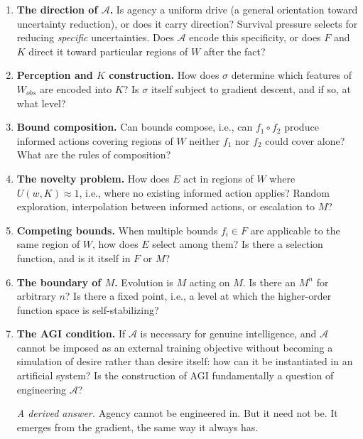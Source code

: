 \documentclass[
]{article}
\begin{document}
\begin{enumerate}
  Formal derivation of this claim from thermodynamic first principles
  (connecting \(U_{lethal}^d\) to physical entropy thresholds and
  demonstrating the inevitability of primitive \(\mathcal{A}\) from
  dissipative system dynamics) remains open. See Prigogine (dissipative
  structures) and England (dissipative adaptation) for adjacent physical
  frameworks.
\item
  \textbf{The direction of \(\mathcal{A}\).} Is agency a uniform drive
  (a general orientation toward uncertainty reduction), or does it carry
  direction? Survival pressure selects for reducing \emph{specific}
  uncertainties. Does \(\mathcal{A}\) encode this specificity, or does
  \(F\) and \(K\) direct it toward particular regions of \(W\) after the
  fact?
\item
  \textbf{Perception and \(K\) construction.} How does \(\sigma\)
  determine which features of \(W_{obs}\) are encoded into \(K\)? Is
  \(\sigma\) itself subject to gradient descent, and if so, at what
  level?
\item
  \textbf{Bound composition.} Can bounds compose, i.e., can
  \(f_1 \circ f_2\) produce informed actions covering regions of \(W\)
  neither \(f_1\) nor \(f_2\) could cover alone? What are the rules of
  composition?
\item
  \textbf{The novelty problem.} How does \(E\) act in regions of \(W\)
  where \(U(w, K) \approx 1\), i.e., where no existing informed action
  applies? Random exploration, interpolation between informed actions,
  or escalation to \(M\)?
\item
  \textbf{Competing bounds.} When multiple bounds \(f_i \in F\) are
  applicable to the same region of \(W\), how does \(E\) select among
  them? Is there a selection function, and is it itself in \(F\) or
  \(M\)?
\item
  \textbf{The boundary of \(M\).} Evolution is \(M\) acting on \(M\). Is
  there an \(M^n\) for arbitrary \(n\)? Is there a fixed point, i.e., a
  level at which the higher-order function space is self-stabilizing?
\item
  \textbf{The AGI condition.} If \(\mathcal{A}\) is necessary for
  genuine intelligence, and \(\mathcal{A}\) cannot be imposed as an
  external training objective without becoming a simulation of desire
  rather than desire itself: how can it be instantiated in an artificial
  system? Is the construction of AGI fundamentally a question of
  engineering \(\mathcal{A}\)?

  \emph{A derived answer.} Agency cannot be engineered in. But it need
  not be. It emerges from the gradient, the same way it always has.


\end{enumerate}
\end{document}
